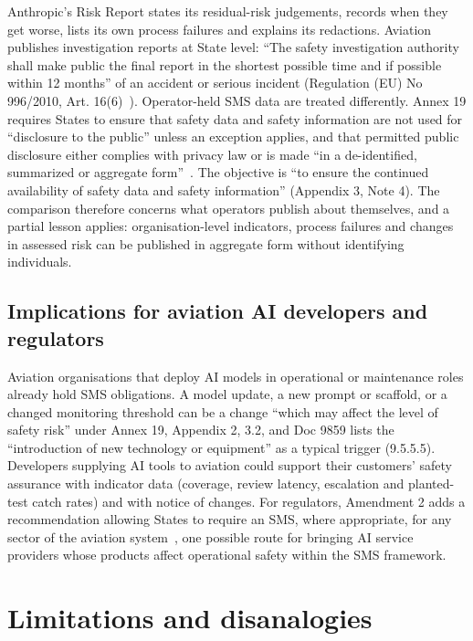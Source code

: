 \documentclass[11pt]{article}
\begin{document}
Anthropic's Risk Report states its residual-risk judgements, records when they get worse, lists its own process failures and explains its redactions. Aviation publishes investigation reports at State level: ``The safety investigation authority shall make public the final report in the shortest possible time and if possible within 12 months'' of an accident or serious incident (Regulation (EU) No 996/2010, Art. 16(6)~\cite{reg2010_996}). Operator-held SMS data are treated differently. Annex 19 requires States to ensure that safety data and safety information are not used for ``disclosure to the public'' unless an exception applies, and that permitted public disclosure either complies with privacy law or is made ``in a de-identified, summarized or aggregate form''~\cite[Appendix~3, 2.1 and 4.2]{icao2016annex19}. The objective is ``to ensure the continued availability of safety data and safety information'' (Appendix 3, Note 4). The comparison therefore concerns what operators publish about themselves, and a partial lesson applies: organisation-level indicators, process failures and changes in assessed risk can be published in aggregate form without identifying individuals.

\subsection{Implications for aviation AI developers and regulators}\label{sec:learn-implications}

Aviation organisations that deploy AI models in operational or maintenance roles already hold SMS obligations. A model update, a new prompt or scaffold, or a changed monitoring threshold can be a change ``which may affect the level of safety risk'' under Annex 19, Appendix 2, 3.2, and Doc 9859 lists the ``introduction of new technology or equipment'' as a typical trigger (9.5.5.5). Developers supplying AI tools to aviation could support their customers' safety assurance with indicator data (coverage, review latency, escalation and planted-test catch rates) and with notice of changes. For regulators, Amendment 2 adds a recommendation allowing States to require an SMS, where appropriate, for any sector of the aviation system~\cite{icao2025amdt2}, one possible route for bringing AI service providers whose products affect operational safety within the SMS framework.

\section{Limitations and disanalogies}\label{sec:limitations}
\end{document}
